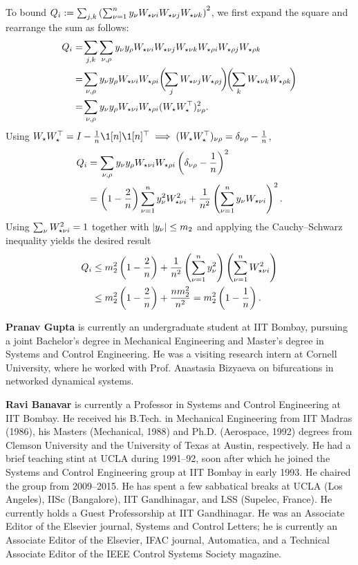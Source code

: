 \documentclass[a4paper]{cas-dc}
\begin{document}
To bound \(Q_i := \sum_{j,k} \left(\sum_{\nu=1}^{n} y_\nu\W[\nu i]\W[\nu j]\W[\nu k] \right)^2\), we first expand the square and rearrange the sum as follows:
\begin{align*}
    Q_{i} & =\! \sum_{j,k} \sum_{\nu,\rho} y_\nu y_\rho \W[\nu i]\W[\nu j]\W[\nu k] \W[\rho i]\W[\rho j]\W[\rho k]                                            \\
          & =\! \sum_{\nu,\rho} y_\nu y_\rho \W[\nu i]\W[\rho i] \biggl(\!\sum_{j}\W[\nu j]\W[\rho j]\!\biggr)\!\biggl(\!\sum_{k}\W[\nu k]\W[\rho k]\!\biggr) \\
          & =\! \sum_{\nu,\rho} y_\nu y_\rho \W[\nu i]\W[\rho i] (\W\W^{\top})_{\nu\rho}^2.
\end{align*}
Using \(\W\W^{\top} = I - \frac{1}{n}\1[n]\1[n]^{\top} \implies (\W\W^{\top})_{\nu\rho} = \delta_{\nu\rho} - \frac{1}{n}\),
\begin{align*}
    Q_i & = \sum_{\nu,\rho} y_\nu y_\rho \W[\nu i]\W[\rho i] \left(\delta_{\nu\rho}-\frac1n\right)^2                               \\
        & = \left(1-\frac2n\right) \sum_{\nu=1}^{n}y_\nu^2\W[\nu i]^2 + \frac1{n^2} \left(\sum_{\nu=1}^{n}y_\nu\W[\nu i]\right)^2.
\end{align*}
Using \(\sum_\nu\W[\nu i]^2=1\) together with \(\abs{y_\nu} \le m_2\) and applying the Cauchy--Schwarz inequality yields the desired result
\begin{align*}
    Q_i & \le m_2^2\left(1-\frac2n\right) + \frac1{n^2} \left(\sum_{\nu=1}^{n}y_\nu^2\right) \left(\sum_{\nu=1}^{n}\W[\nu i]^2\right) \\
        & \le m_2^2 \left(1-\frac2n\right) + \frac{nm_2^2}{n^2} = m_2^2\left(1-\frac1n\right).
\end{align*}




\textbf{Pranav Gupta} is currently an undergraduate student at IIT Bombay, pursuing a joint Bachelor's degree in Mechanical Engineering and Master's degree in Systems and Control Engineering. He was a visiting research intern at Cornell University, where he worked with Prof. Anastasia Bizyaeva on bifurcations in networked dynamical systems.
\endbio

\textbf{Ravi Banavar} is currently a Professor in Systems and Control Engineering at IIT Bombay. He received his B.Tech. in Mechanical Engineering from IIT Madras (1986), his Masters (Mechanical, 1988) and Ph.D. (Aerospace, 1992) degrees from Clemson University and the University of Texas at Austin, respectively. He had a brief teaching stint at UCLA during 1991--92, soon after which he joined the Systems and Control Engineering group at IIT Bombay in early 1993. He chaired the group from 2009--2015. He has spent a few sabbatical breaks at UCLA (Los Angeles), IISc (Bangalore), IIT Gandhinagar, and LSS (Supelec, France). He currently holds a Guest Professorship at IIT Gandhinagar. He was an Associate Editor of the Elsevier journal, Systems and Control Letters; he is currently an Associate Editor of the Elsevier, IFAC journal, Automatica, and a Technical Associate Editor of the IEEE Control Systems Society magazine.
\endbio
\end{document}
